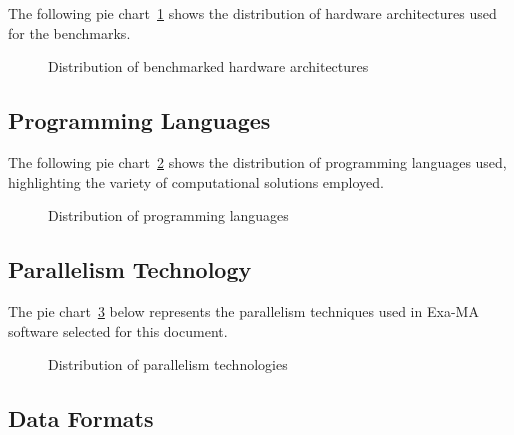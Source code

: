 The following pie chart~\ref{fig:arch} shows the distribution of hardware architectures used for the benchmarks.

\begin{figure}[H]
\centering
{}
\caption{Distribution of benchmarked hardware architectures}
\label{fig:arch}
\end{figure}


\subsection{Programming Languages}

The following pie chart~\ref{fig:languages} shows the distribution of programming languages used, highlighting the variety of computational solutions employed.

\begin{figure}[H]
\centering
{}
\caption{Distribution of programming languages}
\label{fig:languages}
\end{figure}


\subsection{Parallelism Technology}


The pie chart~\ref{fig:parallelism} below represents the parallelism techniques used in Exa-MA software selected for this document.

\begin{figure}[H]
\centering
{}
\caption{Distribution of parallelism technologies}
\label{fig:parallelism}
\end{figure}



\subsection{Data Formats}

